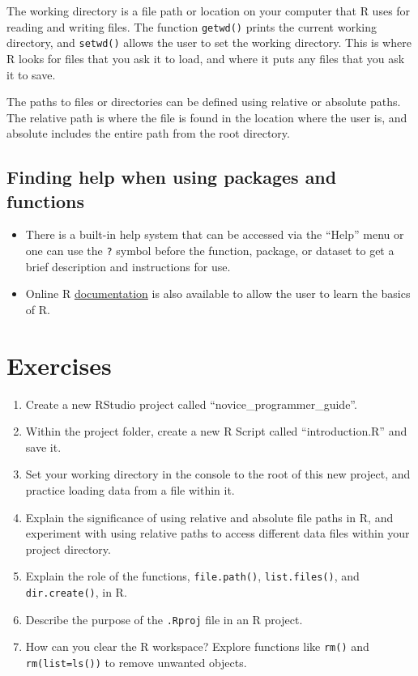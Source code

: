 \documentclass[
  letterpaper,
  DIV=11,
  numbers=noendperiod]{scrreprt}
\begin{document}
The working directory is a file path or location on your computer that R
uses for reading and writing files. The function \texttt{getwd()} prints
the current working directory, and \texttt{setwd()} allows the user to
set the working directory. This is where R looks for files that you ask
it to load, and where it puts any files that you ask it to save.

The paths to files or directories can be defined using relative or
absolute paths. The relative path is where the file is found in the
location where the user is, and absolute includes the entire path from
the root directory.

\subsection{Finding help when using packages and
functions}\label{finding-help-when-using-packages-and-functions}

\begin{itemize}
\item
  There is a built-in help system that can be accessed via the ``Help''
  menu or one can use the \texttt{?} symbol before the function,
  package, or dataset to get a brief description and instructions for
  use.
\item
  Online R \href{https://cran.r-project.org/manuals.html}{documentation}
  is also available to allow the user to learn the basics of R.
\end{itemize}

\section{Exercises}\label{exercises-3}

\begin{enumerate}
\def\labelenumi{\roman{enumi}.}
\item
  Create a new RStudio project called ``novice\_programmer\_guide''.
\item
  Within the project folder, create a new R Script called
  ``introduction.R'' and save it.
\item
  Set your working directory in the console to the root of this new
  project, and practice loading data from a file within it.
\item
  Explain the significance of using relative and absolute file paths in
  R, and experiment with using relative paths to access different data
  files within your project directory.
\item
  Explain the role of the functions, \texttt{file.path()},
  \texttt{list.files()}, and \texttt{dir.create()}, in R.
\item
  Describe the purpose of the \texttt{.Rproj} file in an R project.
\item
  How can you clear the R workspace? Explore functions like
  \texttt{rm()} and \texttt{rm(list=ls())} to remove unwanted objects.
\end{enumerate}
\end{document}

